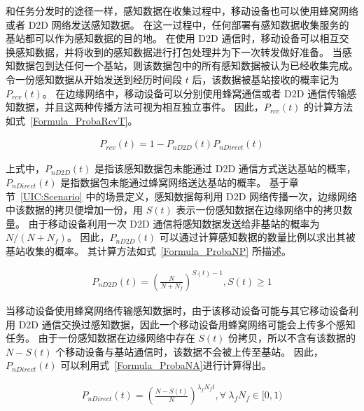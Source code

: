 和任务分发时的途径一样，感知数据在收集过程中，移动设备也可以使用蜂窝网络或者 D2D 网络发送感知数据。
在这一过程中，任何部署有感知数据收集服务的基站都可以作为感知数据的目的地。
在使用 D2D 通信时，移动设备可以相互交换感知数据，并将收到的感知数据进行打包处理并为下一次转发做好准备。
当感知数据包到达任何一个基站，则该数据包中的所有感知数据被认为已经收集完成。
令一份感知数据从开始发送到经历时间段 $t$ 后，该数据被基站接收的概率记为 $P_{rcv}(t)$。
在边缘网络中，移动设备可以分别使用蜂窝通信或者 D2D 通信传输感知数据，并且这两种传播方法可视为相互独立事件。
因此，$P_{rcv}(t)$ 的计算方法如式~\eqref{Formula_ProbaRcvT}。

\vspace{-1em}
\begin{equation}
  \label{Formula_ProbaRcvT}
  \begin{aligned}
    P_{rcv}(t) = 1 - P_{nD2D}(t) P_{nDirect}(t)
  \end{aligned}
\end{equation}

上式中，$P_{nD2D}(t)$ 是指该感知数据包未能通过 D2D 通信方式送达基站的概率，$P_{nDirect}(t)$ 是指数据包未能通过蜂窝网络送达基站的概率。
基于章节~\ref{UIC:Scenario} 中的场景定义，感知数据每利用 D2D 网络传播一次，边缘网络中该数据的拷贝便增加一份，用 $S(t)$ 表示一份感知数据在边缘网络中的拷贝数量。
由于移动设备利用一次 D2D 通信将感知数据发送给非基站的概率为 $N/(N + N_f)$。
因此，$P_{nD2D}(t)$ 可以通过计算感知数据的数量比例以求出其被基站收集的概率。
其计算方法如式~\eqref{Formula_ProbaNP} 所描述。

\begin{equation}
  \label{Formula_ProbaNP}
  \begin{aligned}
  P_{nD2D}(t) = (\frac{N}{N + N_f})^{S(t) - 1}, S(t) \geq 1
  \end{aligned}
\end{equation}

当移动设备使用蜂窝网络传输感知数据时，由于该移动设备可能与其它移动设备利用 D2D 通信交换过感知数据，因此一个移动设备用蜂窝网络可能会上传多个感知任务。
由于一份感知数据在边缘网络中存在 $S(t)$ 份拷贝，所以不含有该数据的 $N - S(t)$ 个移动设备与基站通信时，该数据不会被上传至基站。
因此，$P_{nDirect}(t)$ 可以利用式~\eqref{Formula_ProbaNA}进行计算得出。

\begin{equation}
  \label{Formula_ProbaNA}
  \begin{aligned}
  P_{nDirect}(t) = (\frac{N-S(t)}{N})^{\lambda_f N_f t}, \forall \ \lambda_f N_f \in [0,1)
  \end{aligned}
\end{equation}

